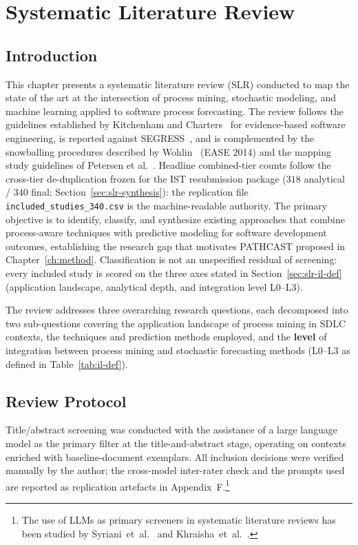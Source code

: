 \chapter{Systematic Literature Review}
\label{ch:slr}

\section{Introduction}
\label{sec:slr-intro}

This chapter presents a systematic literature review (SLR) conducted to map
the state of the art at the intersection of process mining, stochastic
modeling, and machine learning applied to software process forecasting. The
review follows the guidelines established by Kitchenham and
Charters~\cite{kitchenham2007} for evidence-based software engineering,
is reported against SEGRESS~\cite{kitchenham2023segress}, and is complemented
by the snowballing procedures described by
Wohlin~\cite{wohlin2014guidelines} (EASE 2014) and the mapping study guidelines of Petersen et
al.~\cite{petersen2015}. Headline combined-tier counts follow the
cross-tier de-duplication frozen for the IST resubmission package
($318$ analytical / $340$ final; Section~\ref{sec:slr-synthesis}): the
replication file \texttt{included\_studies\_340.csv} is the machine-readable
authority. The primary objective is to identify, classify, and
synthesize existing approaches that combine process-aware techniques with
predictive modeling for software development outcomes, establishing the
research gap that motivates PATHCAST proposed in
Chapter~\ref{ch:method}. Classification is not an unspecified residual of
screening: every included study is scored on the three axes stated in
Section~\ref{sec:slr-il-def} (application landscape, analytical depth, and
integration level L0--L3).

The review addresses three overarching research questions, each decomposed
into two sub-questions covering the application landscape of process mining in
SDLC contexts, the techniques and prediction methods employed, and the
\textbf{level} of integration between process mining and stochastic forecasting
methods (L0--L3 as defined in Table~\ref{tab:il-def}).


\section{Review Protocol}
\label{sec:slr-protocol}

Title/abstract screening was conducted with the assistance of a large
language model as the primary filter at the title-and-abstract stage,
operating on contexts enriched with baseline-document exemplars. All
inclusion decisions were verified manually by the author; the cross-model
inter-rater check and the prompts used are reported as replication
artefacts in Appendix~F.\footnote{The use of LLMs as primary screeners in
systematic literature reviews has been studied by
Syriani~et~al.~\cite{syriani2023} and Khraisha~et~al.~\cite{khraisha2024}.}

